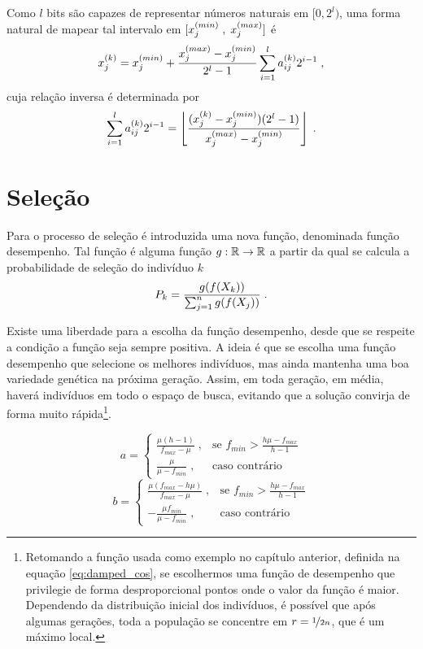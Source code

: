 Como $l$ bits são capazes de representar números naturais em $ [0, 2^l) $,
uma forma natural de mapear tal intervalo
em $ [ x^{(min)}_{j} \; , \; x^{(max)}_{j} ] $ é
\begin{equation}
  x^{(k)}_j = x^{(min)}_{j} + \frac{x^{(max)}_{j} - x^{(min)}_{j}}{2^l - 1} \sum_{i = 1}^l {a}^{(k)}_{ij} 2^{i - 1} \;\mathrm{,}
\end{equation}
cuja relação inversa é determinada por
\begin{equation}
  \sum_{i = 1}^l {a}^{(k)}_{ij} 2^{i - 1} =
  \left\lfloor \frac{({x}^{(k)}_{j} - x^{(min)}_{j})(2^l - 1)}{x^{(max)}_{j} - x^{(min)}_{j}} \right\rfloor
  \;\mathrm{.}
\end{equation}

\newpage
\section{Seleção}

Para o processo de seleção é introduzida uma nova função, denominada função desempenho.
Tal função é alguma função $ g : \mathbb{R} \rightarrow \mathbb{R} $ a partir da qual se calcula a probabilidade
de seleção do indivíduo $k$
\begin{equation}
  P_k = \frac{g(f(X_k))}{\sum_{j = 1}^n g(f(X_j))} \;\mathrm{.}
\end{equation}

Existe uma liberdade para a escolha da função desempenho, desde que se respeite a condição a
função seja sempre positiva. A ideia é que se escolha uma função desempenho que
selecione os melhores indivíduos, mas ainda mantenha uma boa variedade genética na
próxima geração. Assim, em toda geração, em média, haverá indivíduos em todo o espaço
de busca, evitando que a solução convirja de forma muito rápida\footnote{
  Retomando a função usada como exemplo no capítulo anterior, definida na equação
  \ref{eq:damped_cos}, se escolhermos uma função de desempenho que privilegie
  de forma desproporcional pontos onde o valor da função é maior. Dependendo da
  distribuição inicial dos indivíduos, é possível que após algumas gerações,
  toda a população se concentre em $ r = \nicefrac{1}{2n} $, que é um
  máximo local.
}.

\newcommand{\fmin}{f_{min}}
\newcommand{\fmax}{f_{max}}

\begin{equation}
  a =
  \begin{cases}
    \frac{\mu (h - 1)}{\fmax - \mu} \;, & \text{se } \fmin > \frac{h\mu - \fmax}{h - 1} \\
    \frac{\mu}{\mu - \fmin}         \;, & \text{caso contrário}
  \end{cases}
  \label{eq:linear_fit_a}
\end{equation}
\begin{equation}
  b =
  \begin{cases}
    \frac{\mu (\fmax - h\mu)}{\fmax - \mu} \;, & \text{se } \fmin > \frac{h\mu - \fmax}{h - 1} \\
    - \frac{\mu\fmin}{\mu - \fmin}         \;, & \text{caso contrário}
  \end{cases}
  \label{eq:linear_fit_b}
\end{equation}

